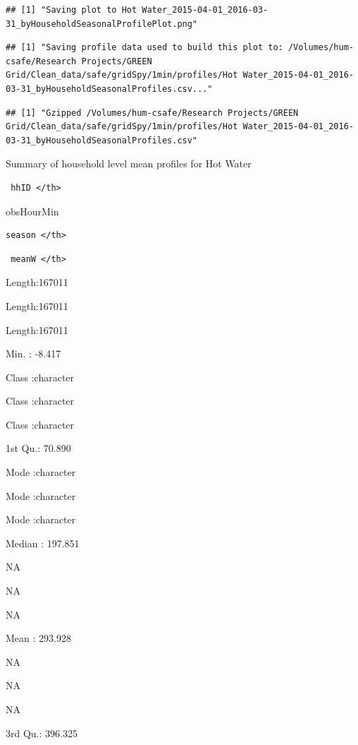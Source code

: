 \documentclass[]{article}
\begin{document}
\begin{verbatim}
## [1] "Saving plot to Hot Water_2015-04-01_2016-03-31_byHouseholdSeasonalProfilePlot.png"
\end{verbatim}

\begin{verbatim}
## [1] "Saving profile data used to build this plot to: /Volumes/hum-csafe/Research Projects/GREEN Grid/Clean_data/safe/gridSpy/1min/profiles/Hot Water_2015-04-01_2016-03-31_byHouseholdSeasonalProfiles.csv..."
\end{verbatim}

\begin{verbatim}
## [1] "Gzipped /Volumes/hum-csafe/Research Projects/GREEN Grid/Clean_data/safe/gridSpy/1min/profiles/Hot Water_2015-04-01_2016-03-31_byHouseholdSeasonalProfiles.csv"
\end{verbatim}

Summary of household level mean profiles for Hot Water

\begin{verbatim}
 hhID </th>
\end{verbatim}

obsHourMin

\begin{verbatim}
season </th>
\end{verbatim}

\begin{verbatim}
 meanW </th>
\end{verbatim}

Length:167011

Length:167011

Length:167011

Min. : -8.417

Class :character

Class :character

Class :character

1st Qu.: 70.890

Mode :character

Mode :character

Mode :character

Median : 197.851

NA

NA

NA

Mean : 293.928

NA

NA

NA

3rd Qu.: 396.325
\end{document}
